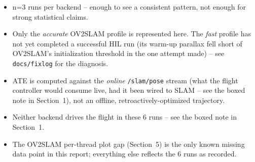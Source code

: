 \documentclass[11pt]{article}
\begin{document}
\begin{itemize}
  \item n=3 runs per backend -- enough to see a consistent pattern, not enough
    for strong statistical claims.
  \item Only the \emph{accurate} OV2SLAM profile is represented here. The
    \emph{fast} profile has not yet completed a successful HIL run (its
    warm-up parallax fell short of OV2SLAM's initialization threshold in the
    one attempt made) -- see \texttt{docs/fixlog} for the diagnosis.
  \item ATE is computed against the \emph{online} \texttt{/slam/pose} stream
    (what the flight controller would consume live, had it been wired to SLAM
    -- see the boxed note in Section~1), not an offline, retroactively-optimized
    trajectory.
  \item Neither backend drives the flight in these 6 runs -- see the boxed note
    in Section~1.
  \item The OV2SLAM per-thread plot gap (Section~5) is the only known missing
    data point in this report; everything else reflects the 6 runs as recorded.
\end{itemize}
\end{document}
